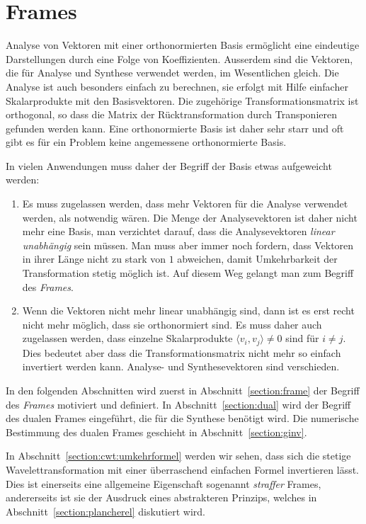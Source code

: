 %
%
%
\chapter{Frames
\label{chapter:frames}}
Analyse von Vektoren mit einer orthonormierten Basis ermöglicht eine
eindeutige Darstellungen durch eine Folge von Koeffizienten. 
Ausserdem sind die Vektoren, die für Analyse und Synthese verwendet
werden, im Wesentlichen gleich.
Die Analyse ist auch besonders einfach zu berechnen,
sie erfolgt mit Hilfe einfacher Skalarprodukte mit den Basisvektoren.
Die zugehörige Transformationsmatrix ist orthogonal, so dass die
Matrix der Rücktransformation durch Transponieren gefunden werden kann.
Eine orthonormierte Basis ist daher sehr starr und oft gibt es für ein
Problem keine angemessene orthonormierte Basis.

In vielen Anwendungen muss daher der Begriff der Basis etwas aufgeweicht
werden:
\begin{enumerate}
\item
Es muss zugelassen werden, dass mehr Vektoren für die Analyse verwendet
werden, als notwendig wären.
Die Menge der Analysevektoren ist daher nicht mehr eine Basis, man
verzichtet darauf, dass die Analysevektoren {\em linear unabhängig} sein
müssen.
Man muss aber immer noch fordern, dass Vektoren in ihrer Länge nicht
zu stark von $1$ abweichen,
damit Umkehrbarkeit der Transformation stetig möglich ist.
Auf diesem Weg gelangt man zum Begriff des {\em Frames}.
\item
Wenn die Vektoren nicht mehr linear unabhängig sind, dann ist es erst
recht nicht mehr möglich, dass sie orthonormiert sind.
Es muss daher auch zugelassen werden, dass einzelne Skalarprodukte 
$\langle v_i,v_j\rangle\ne 0$ sind für $i\ne j$.
Dies bedeutet aber dass die Transformationsmatrix nicht mehr so einfach
invertiert werden kann.
Analyse- und Synthesevektoren sind verschieden.
\end{enumerate}
In den folgenden Abschnitten wird zuerst in Abschnitt~\ref{section:frame}
der Begriff des {\em Frames} motiviert und definiert.
%
In Abschnitt~\ref{section:dual} wird der Begriff des dualen Frames
eingeführt, die für die Synthese benötigt wird.
Die numerische Bestimmung des dualen Frames geschieht in
Abschnitt~\ref{section:ginv}.

In Abschnitt~\ref{section:cwt:umkehrformel} werden wir sehen, dass sich
%
die stetige Wavelettransformation mit einer überraschend einfachen
Formel invertieren lässt.
Dies ist einerseits eine allgemeine Eigenschaft sogenannt {\em straffer}
Frames, andererseits ist sie der Ausdruck eines abstrakteren Prinzips,
welches in Abschnitt~\ref{section:plancherel} diskutiert wird.

